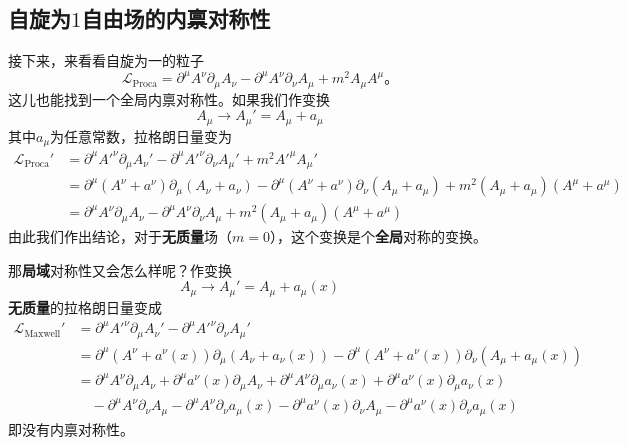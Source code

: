 \subsection{自旋为$1$自由场的内禀对称性}\label{sec7.1.2}
接下来，来看看自旋为一的粒子
\begin{equation}
\label{equ7.6}
{\mathscr L}_\text{Proca} = \partial^\mu A^\nu\partial_\mu A_\nu - \partial^\mu A^\nu \partial_\nu A_\mu + m^2A_\mu A^\mu \text{。}
\end{equation}
这儿也能找到一个全局内禀对称性。如果我们作变换
\begin{equation}
\label{equ7.7}
A_\mu \rightarrow A_\mu' = A_\mu+a_\mu
\end{equation}
其中$a_\mu$为任意常数，拉格朗日量变为
\begin{align}
{\mathscr L}_\text{Proca}' &= \partial^\mu A'^\nu\partial_\mu A_\nu' - \partial^\mu A'^\nu \partial_\nu A_\mu' + m^2A'^\mu A_\mu' \nonumber\\
&= \partial^\mu (A^\nu+a^\nu)\partial_\mu (A_\nu+a_\nu) - \partial^\mu (A^\nu+a^\nu) \partial_\nu ( A_\mu+a_\mu) + m^2( A_\mu+a_\mu) ( A^\mu+a^\mu) \nonumber\\
\label{equ7.8}
&= \partial^\mu A^\nu\partial_\mu A_\nu - \partial^\mu A^\nu \partial_\nu A_\mu + m^2( A_\mu+a_\mu) ( A^\mu+a^\mu)
\end{align}
由此我们作出结论，对于{\bfseries 无质量}场（$m=0$），这个变换是个{\bfseries 全局}对称的变换。

那{\bfseries 局域}对称性又会怎么样呢？作变换
\begin{equation}
\label{equ7.9}
A_\mu \rightarrow A_\mu' = A_\mu+a_\mu(x)
\end{equation}
{\bfseries 无质量}的拉格朗日量变成
\begin{align}
{\mathscr L}_\text{Maxwell}' &= \partial^\mu A'^\nu \partial_\mu A_\nu' - \partial^\mu A'^\nu \partial_\nu A_\mu' \nonumber\\
&= \partial^\mu (A^\nu+a^\nu(x))\partial_\mu (A_\nu+a_\nu(x)) - \partial^\mu (A^\nu+a^\nu(x)) \partial_\nu ( A_\mu+a_\mu(x))  \nonumber\\
&= \partial^\mu A^\nu\partial_\mu A_\nu+\partial^\mu a^\nu(x)\partial_\mu A_\nu+\partial^\mu A^\nu\partial_\mu a_\nu(x) +\partial^\mu a^\nu(x)\partial_\mu a_\nu(x) \nonumber\\
\label{equ7.10}
& \quad - \partial^\mu A^\nu \partial_\nu A_\mu - \partial^\mu A^\nu \partial_\nu a_\mu(x)-\partial^\mu a^\nu(x) \partial_\nu A_\mu - \partial^\mu a^\nu(x) \partial_\nu a_\mu(x)
\end{align}
即没有内禀对称性。


